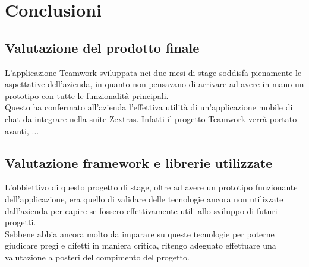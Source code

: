 
\chapter{Conclusioni}\label{chap:conclusions}
\section{Valutazione del prodotto finale}
L’applicazione Teamwork sviluppata nei due mesi di stage soddisfa pienamente le aspettative dell’azienda, in quanto non pensavano di arrivare ad avere in mano un prototipo con tutte le funzionalità principali. \\
Questo ha confermato all'azienda l'effettiva utilità di un'applicazione mobile di chat da integrare nella suite Zextras. Infatti il progetto Teamwork verrà portato avanti, ...




\section{Valutazione framework e librerie utilizzate}
L'obbiettivo di questo progetto di stage, oltre ad avere un prototipo funzionante dell'applicazione, era quello di validare delle tecnologie ancora non utilizzate dall'azienda per capire se fossero effettivamente utili allo sviluppo di futuri progetti. \\
Sebbene abbia ancora molto da imparare su queste tecnologie per poterne giudicare pregi e difetti in maniera critica, ritengo adeguato effettuare una valutazione a posteri del compimento del progetto.
